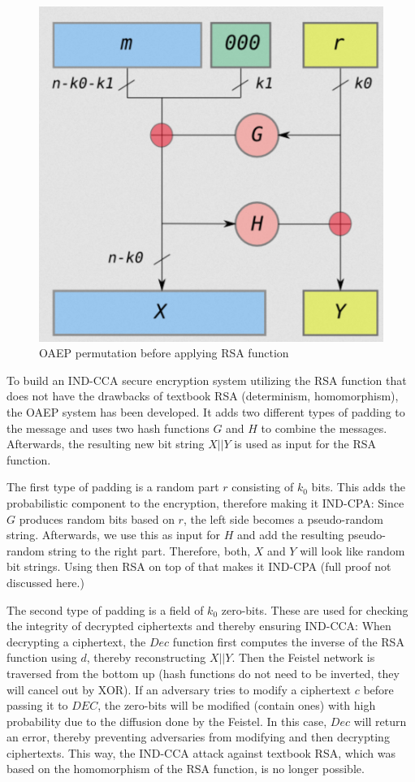 \begin{figure}
    \center
    \includegraphics[width=\linewidth]{gfx/OAEP.png}
    \caption{OAEP permutation before applying RSA function}
    \label{fig:OAEP}
\end{figure}

To build an IND-CCA secure encryption system utilizing the RSA function that does not have the drawbacks of textbook RSA (determinism, homomorphism), the OAEP system has been developed.
It adds two different types of padding to the message and uses two hash functions $G$ and $H$ to combine the messages.
Afterwards, the resulting new bit string $X||Y$ is used as input for the RSA function.

The first type of padding is a random part $r$ consisting of $k_0$ bits.
This adds the probabilistic component to the encryption, therefore making it IND-CPA:
Since $G$ produces random bits based on $r$, the left side becomes a pseudo-random string.
Afterwards, we use this as input for $H$ and add the resulting pseudo-random string to the right part.
Therefore, both, $X$ and $Y$ will look like random bit strings.
Using then RSA on top of that makes it IND-CPA (full proof not discussed here.)

The second type of padding is a field of $k_0$ zero-bits.
These are used for checking the integrity of decrypted ciphertexts and thereby ensuring IND-CCA:
When decrypting a ciphertext, the $Dec$ function first computes the inverse of the RSA function using $d$, thereby reconstructing $X||Y$.
Then the Feistel network is traversed from the bottom up (hash functions do not need to be inverted, they will cancel out by XOR).
If an adversary tries to modify a ciphertext $c$ before passing it to $DEC$, the zero-bits will be modified (contain ones) with high probability due to the diffusion done by the Feistel.
In this case, $Dec$ will return an error, thereby preventing adversaries from modifying and then decrypting ciphertexts.
This way, the IND-CCA attack against textbook RSA, which was based on the homomorphism of the RSA function, is no longer possible.
